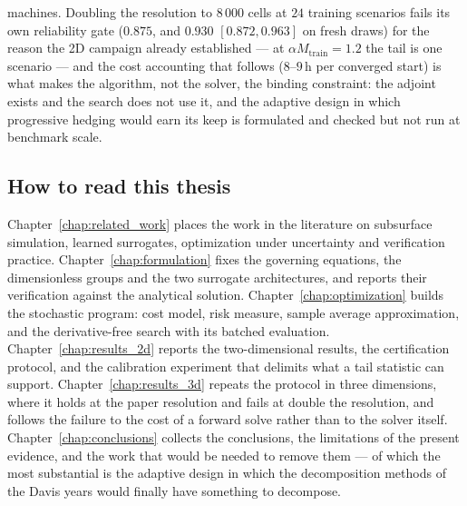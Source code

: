 \documentclass[11pt]{article}
\begin{document}
\begin{enumerate}
        machines. Doubling the resolution to $8\,000$ cells at $24$ training
        scenarios fails its own reliability gate ($0.875$, and $0.930$ $[0.872,
        0.963]$ on fresh draws) for the reason the 2D campaign already
        established --- at $\alpha M_{\text{train}}=1.2$ the tail is one
        scenario --- and the cost accounting that follows ($8$--$9$\,h per
        converged start) is what makes the algorithm, not the solver, the
        binding constraint: the adjoint exists and the search does not use it, and
        the adaptive design in which progressive hedging would earn its keep is
        formulated and checked but not run at benchmark scale.
\end{enumerate}

\subsection{How to read this thesis}

Chapter~\ref{chap:related_work} places the work in the literature on subsurface simulation,
learned surrogates, optimization under uncertainty and verification practice.
Chapter~\ref{chap:formulation} fixes the governing equations, the dimensionless groups
and the two surrogate architectures, and reports their verification against the
analytical solution. Chapter~\ref{chap:optimization} builds the stochastic program:
cost model, risk measure, sample average approximation, and the derivative-free
search with its batched evaluation. Chapter~\ref{chap:results_2d} reports the
two-dimensional results, the certification protocol, and the calibration
experiment that delimits what a tail statistic can support.
Chapter~\ref{chap:results_3d} repeats the protocol in three dimensions, where it
holds at the paper resolution and fails at double the resolution, and follows the
failure to the cost of a forward solve rather than to the solver itself.
Chapter~\ref{chap:conclusions} collects the conclusions, the limitations of the present
evidence, and the work that would be needed to remove them --- of which the most
substantial is the adaptive design in which the decomposition methods of the
Davis years would finally have something to decompose.
\end{document}
